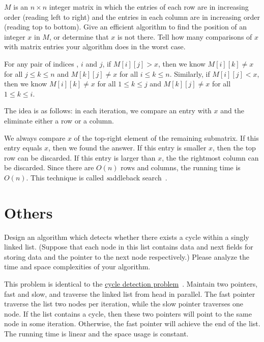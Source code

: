 \begin{Exercise}
$M$ is an $n \times n$ integer matrix in which the entries of each row are in increasing order (reading left to right) and the entries in each column are in increasing order (reading top to bottom). Give an efficient algorithm to find the position of an integer $x$ in $M$, or determine that $x$ is not there. Tell how many comparisons of $x$ with matrix entries your algorithm does in the worst case. 
\end{Exercise}
\begin{Answer}
For any pair of indices , $i$ and $j$, if $M[i][j] > x$, then we know $M[i][k] \neq x$ for all $j \leq k \leq n$ and $M[k][j] \neq x$ for all $i \leq k \leq n$. Similarly, if $M[i][j] < x$, then we know $M[i][k] \neq x$ for all $1 \leq k \leq j$ and $M[k][j] \neq x$ for all $1 \leq k \leq i$. 

The idea is as follows: in each iteration, we compare an entry with $x$ and the eliminate either a row or a column.

We always compare $x$ of the top-right element of the remaining submatrix. If this entry equals $x$, then we found the answer. If this entry is smaller $x$, then the top row can be discarded. If this entry is larger than $x$, the the rightmost column can be discarded. Since there are $O(n)$ rows and columns, the running time is $O(n)$. This technique is called {\emph saddleback search}~\cite{Bird2006}.
\end{Answer}


\section{Others}
\begin{Exercise}
Design an algorithm which detects whether there exists a cycle within a singly linked list. (Suppose that each node in this list contains data and next fields for storing data and the pointer to the next node respectively.) Please analyze the time and space complexities of your algorithm. 
\end{Exercise}
\begin{Answer}
This problem is identical to the \href{https://en.wikipedia.org/wiki/Cycle_detection}{cycle detection problem}~\cite{Nesterenko2012}. Maintain two pointers, fast and slow, and traverse the linked list from head in parallel. The fast pointer traverse the list two nodes per iteration, while the slow pointer traverses one node. If the list contains a cycle, then these two pointers will point to the same node in some iteration. Otherwise, the fast pointer will achieve the end of the list. The running time is linear and the space usage is constant.
\end{Answer}


